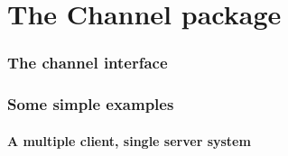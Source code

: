 \part*{The Channel package}
\section*{The channel interface}
\section*{Some simple examples}
\subsection*{A multiple client, single server system}
